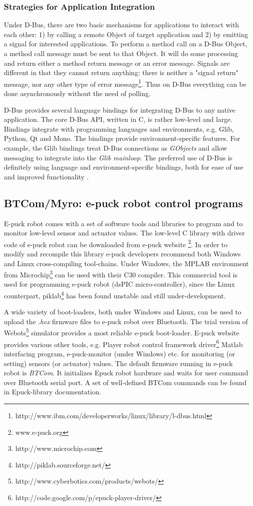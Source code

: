 \subsubsection*{Strategies for Application Integration}
Under D-Bus, there are two basic mechanisms for applications to interact with each other: 1) by calling a remote Object of target application and 2) by emitting a signal for interested applications. To perform a method call on a D-Bus Object, a method call message must be sent to that Object. It will do some processing and return either a method return message or an error message. Signals are different in that they cannot return anything: there is neither a "signal return" message, nor any other type of error message\footnote{http://www.ibm.com/developerworks/linux/library/l-dbus.html}. Thus on D-Bus everything can be done asynchronously without the need of polling.

D-Bus provides several language bindings for integrating D-Bus to any native application. The core D-Bus API, written in C, is rather low-level and large. Bindings integrate with programming languages and environments, e.g. Glib, Python, Qt and Mono. The bindings provide environment-specific features. For example, the Glib bindings treat D-Bus connections as {\em GObjects} and allow messaging to integrate into the {\em Glib mainloop}. The preferred use of D-Bus is definitely using language and environment-specific bindings, both for ease of use and improved functionality \cite{Love2005}.
\subsection{BTCom/Myro: e-puck robot control programs}
\label{expt-tools:btcom}
E-puck robot comes with a set of software tools and libraries to program and to monitor low-level sensor and actuator values. The low-level C library with driver code of e-puck robot can be downloaded from e-puck website \footnote{www.e-puck.org}. In order to modify and recompile this library e-puck developers recommend both Windows and Linux cross-compiling tool-chains. Under Windows, the MPLAB environment from Microchip\footnote{http://www.microchip.com} can be used with their C30 compiler. This commercial tool is used for programming e-puck robot (dsPIC micro-controller), since the Linux counterpart, piklab\footnote{http://piklab.sourceforge.net/} has been found unstable and still under-development. 

A wide variety of boot-loaders, both under Windows and Linux, can be used to upload the {\em .hex} firmware files to e-puck robot over Bluetooth.  The trial version of Webots\footnote{http://www.cyberbotics.com/products/webots/} simulator provides a most reliable e-puck boot-loader. E-puck website provides various other tools, e.g. Player robot control framework driver\footnote{http://code.google.com/p/epuck-player-driver/} Matlab interfacing program, e-puck-monitor (under Windows) etc. for monitoring (or setting) sensors (or actuator) values. The default firmware running in e-puck robot is {\em BTCom}. It initializes Epuck robot hardware and waits for user command over Bluetooth serial port. A set of well-defined BTCom commands can be found in Epuck-library documentation. 

